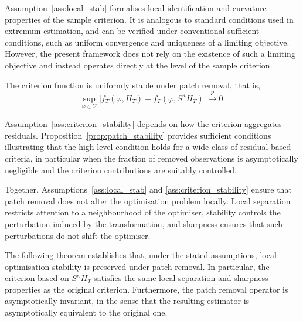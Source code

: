 \documentclass[12pt]{article}
\numberwithin{equation}{section}
\begin{document}
Assumption~\ref{ass:local_stab} formalises local identification and curvature properties of the sample criterion. 
It is analogous to standard conditions used in extremum estimation, and can be verified under conventional sufficient conditions, such as uniform convergence and uniqueness of a limiting objective. 
However, the present framework does not rely on the existence of such a limiting objective and instead operates directly at the level of the sample criterion.


\begin{assumption}\label{ass:criterion_stability}
The criterion function is uniformly stable under patch removal, that is,
\begin{equation}
\sup_{\varphi\in\mathcal V}
\bigl|
f_T(\varphi,H_T)-f_T(\varphi,S^\kappa H_T)
\bigr|
\overset{p}{\longrightarrow}0.
\end{equation}
\end{assumption}

Assumption~\ref{ass:criterion_stability} depends on how the criterion aggregates residuals. 
Proposition~\ref{prop:patch_stability} provides sufficient conditions illustrating that the high-level condition holds for a wide class of residual-based criteria, in particular when the fraction of removed observations is asymptotically negligible and the criterion contributions are suitably controlled.

Together, Assumptions~\ref{ass:local_stab} and \ref{ass:criterion_stability} ensure that patch removal does not alter the optimisation problem locally. 
Local separation restricts attention to a neighbourhood of the optimiser, stability controls the perturbation induced by the transformation, and sharpness ensures that such perturbations do not shift the optimiser.


The following theorem establishes that, under the stated assumptions, local optimisation stability is preserved under patch removal.
In particular, the criterion based on $S^\kappa H_T$ satisfies the same local separation and sharpness properties as the original criterion.
Furthermore, the patch removal operator is asymptotically invariant, in the sense that the resulting estimator is asymptotically equivalent to the original one.
\end{document}
